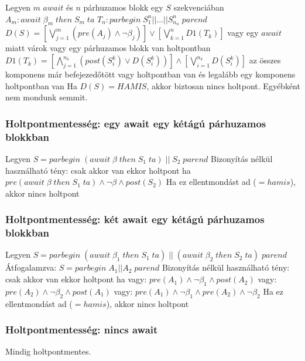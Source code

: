 \documentclass[12pt,a4paper]{article}
\begin{document}
\begin{outline}
	\1 Legyen $m$ $await$ és $n$ párhuzamos blokk egy $S$ szekvenciában
		\2 $A_m: await \; \beta_m \; then \; S_m \; ta$
		\2 $T_n : parbegin \; S^n_1||...||S^n_{n_n} \; parend$
	\1 $D(S)=[\bigvee_{j=1}^{m} (pre(A_j) \wedge \lnot \beta_j)] \lor [\bigvee_{k=1}^{n}D1(T_k)]$
		\2 vagy egy $await$ miatt várok
		\2 vagy egy párhuzamos blokk van holtpontban
	\1 $D1(T_k) = [\bigwedge_{j=1}^{n_k} (post(S_i^k) \lor D(S_i^k))] \wedge [\bigvee_{i=1}^{n_k}D(S_i^k)]$
		\2 az összes komponens már befejezedőtött vagy holtpontban van
		\2 és legalább egy komponens holtpontban van
	\1 Ha $D(S)=HAMIS$, akkor biztosan nincs holtpont. Egyébként nem mondunk semmit.
\end{outline}

\subsubsection{Holtpontmentesség: egy await egy kétágú párhuzamos blokkban}

\begin{outline}
	\1 Legyen $S=parbegin \; (await \; \beta \; then \; S_1 \; ta) \; ||\; S_2 \; parend$
	\1 Bizonyítás nélkül használható tény: csak akkor van ekkor holtpont ha\\
	$pre(await \; \beta \; then \; S_1 \; ta) \wedge \lnot \beta \wedge post(S_2)$
	\1 Ha ez ellentmondást ad ($=hamis$), akkor nincs holtpont
\end{outline}

\subsubsection{Holtpontmentesség: két await egy kétágú párhuzamos blokkban}

\begin{outline}
	\1 Legyen $S=parbegin \; (await \; \beta_1 \; then \; S_1 \; ta) \; ||\; (await \; \beta_2 \; then \; S_2 \; ta) \; parend$
		\2 Átfogalamzva: $S=parbegin \; A_1||A_2 \; parend$
	\1 Bizonyítás nélkül használható tény: csak akkor van ekkor holtpont ha
		\2 vagy: $pre(A_1) \wedge \lnot \beta_1 \wedge post(A_2)$
		\2 vagy: $pre(A_2) \wedge \lnot \beta_2 \wedge post(A_1)$
		\2 vagy: $pre(A_1) \wedge \lnot \beta_1 \wedge pre(A_2) \wedge \lnot \beta_2$
	\1 Ha ez ellentmondást ad ($=hamis$), akkor nincs holtpont
\end{outline}

\subsubsection{Holtpontmentesség: nincs await}

\begin{outline}
	\1 Mindig holtpontmentes.
\end{outline}
\end{document}
